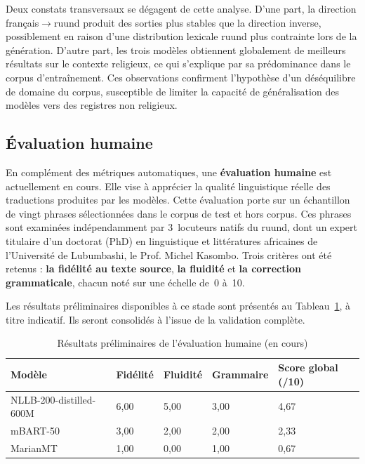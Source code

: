 Deux constats transversaux se dégagent de cette analyse. D'une part, la direction français$\rightarrow$ruund produit des sorties plus stables que la direction inverse, possiblement en raison d'une distribution lexicale ruund plus contrainte lors de la génération. D'autre part, les trois modèles obtiennent globalement de meilleurs résultats sur le contexte religieux, ce qui s'explique par sa prédominance dans le corpus d'entraînement. Ces observations confirment l'hypothèse d'un déséquilibre de domaine du corpus, susceptible de limiter la capacité de généralisation des modèles vers des registres non religieux.

\subsection{Évaluation humaine}
\label{sec:evaluation-humaine}
En complément des métriques automatiques, une \textbf{évaluation humaine} est actuellement en cours. Elle vise à apprécier la qualité linguistique réelle des traductions produites par les modèles. Cette évaluation porte sur un échantillon de vingt phrases sélectionnées dans le corpus de test et hors corpus. Ces phrases sont examinées indépendamment par 3~locuteurs natifs du ruund, dont un expert titulaire d'un doctorat (PhD) en linguistique et littératures africaines de l'Université de Lubumbashi, le Prof. Michel Kasombo. Trois critères ont été retenus : \textbf{la fidélité au texte source}, \textbf{la fluidité} et \textbf{la correction grammaticale}, chacun noté sur une échelle de~0 à~10.

Les résultats préliminaires disponibles à ce stade sont présentés au Tableau~\ref{tab:evaluation-humaine}, à titre indicatif. Ils seront consolidés à l'issue de la validation complète.

\begin{table}[H]
\centering
\renewcommand{\arraystretch}{1.5}
\begin{tabular}{p{4cm}p{2.3cm}p{2.3cm}p{2.3cm}p{2cm}}
\toprule
\textbf{Modèle} & \textbf{Fidélité} & \textbf{Fluidité} & \textbf{Grammaire} & \textbf{Score global (/10)} \\
\midrule
\ac{NLLB}-200-distilled-600M & 6,00 & 5,00 & 3,00 & 4,67 \\
\ac{mBART}-50 & 3,00 & 2,00 & 2,00 & 2,33 \\
\ac{MarianMT} & 1,00 & 0,00 & 1,00 & 0,67 \\
\bottomrule
\end{tabular}
\caption{Résultats préliminaires de l'évaluation humaine (en cours)}
\label{tab:evaluation-humaine}
\end{table}

